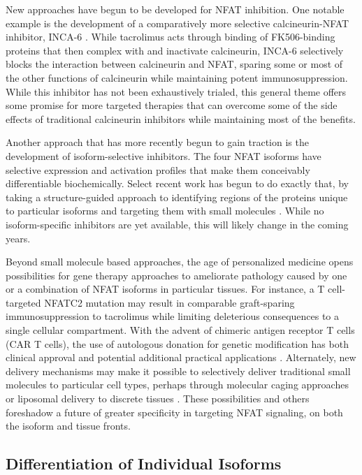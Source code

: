 New approaches have begun to be developed for NFAT inhibition. One notable example is the development of a comparatively more selective calcineurin\hyp{}NFAT inhibitor, INCA\hyp{}6 \citep{Roehrl2004}. While tacrolimus acts through binding of FK506\hyp{}binding proteins that then complex with and inactivate calcineurin, INCA\hyp{}6 selectively blocks the interaction between calcineurin and NFAT, sparing some or most of the other functions of calcineurin while maintaining potent immunosuppression. While this inhibitor has not been exhaustively trialed, this general theme offers some promise for more targeted therapies that can overcome some of the side effects of traditional calcineurin inhibitors while maintaining most of the benefits. 

Another approach that has more recently begun to gain traction is the development of isoform\hyp{}selective inhibitors. The four NFAT isoforms have selective expression and activation profiles that make them conceivably differentiable biochemically. Select recent work has begun to do exactly that, by taking a structure\hyp{}guided approach to identifying regions of the proteins unique to particular isoforms and targeting them with small molecules \citep{Kitamura2021}. While no isoform\hyp{}specific inhibitors are yet available, this will likely change in the coming years.

Beyond small molecule based approaches, the age of personalized medicine opens possibilities for gene therapy approaches to ameliorate pathology caused by one or a combination of NFAT isoforms in particular tissues. For instance, a T cell\hyp{}targeted NFATC2 mutation may result in comparable graft\hyp{}sparing immunosuppression to tacrolimus while limiting deleterious consequences to a single cellular compartment. With the advent of chimeric antigen receptor T cells (CAR T cells), the use of autologous donation for genetic modification has both clinical approval and potential additional practical applications \citep{June2007}. Alternately, new delivery mechanisms may make it possible to selectively deliver traditional small molecules to particular cell types, perhaps through molecular caging approaches or liposomal delivery to discrete tissues \citep{Mukhtar2020, Hu2019}. These possibilities and others foreshadow a future of greater specificity in targeting NFAT signaling, on both the isoform and tissue fronts. 

\subsection{Differentiation of Individual Isoforms}\label{diffnfat}

